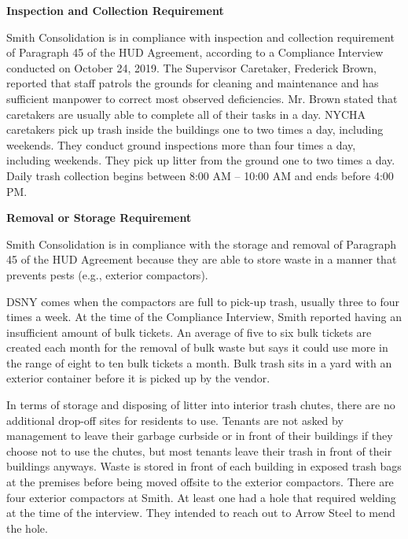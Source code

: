 

\textbf{Inspection and Collection Requirement} 

Smith Consolidation is in compliance with inspection and collection requirement of Paragraph 45 of the HUD Agreement, according to a Compliance Interview conducted on October 24, 2019. The Supervisor Caretaker, Frederick Brown, reported that staff patrols the grounds for cleaning and maintenance and has sufficient manpower to correct most observed deficiencies. Mr. Brown stated that caretakers are usually able to complete all of their tasks in a day.  NYCHA caretakers pick up trash inside the buildings one to two times a day, including weekends. They conduct ground inspections more than four times a day, including weekends. They pick up litter from the ground one to two times a day. Daily trash collection begins between 8:00 AM -- 10:00 AM and ends before 4:00 PM. 

 

\textbf{Removal or Storage Requirement} 

Smith Consolidation is in compliance with the storage and removal of Paragraph 45 of the HUD Agreement because they are able to store waste in a manner that prevents pests (e.g., exterior compactors). 

DSNY comes when the compactors are full to pick-up trash, usually three to four times a week. At the time of the Compliance Interview, Smith reported having an insufficient amount of bulk tickets. An average of five to six bulk tickets are created each month for the removal of bulk waste but says it could use more in the range of eight to ten bulk tickets a month. Bulk trash sits in a yard with an exterior container before it is picked up by the vendor.  

 

In terms of storage and disposing of litter into interior trash chutes, there are no additional drop-off sites for residents to use. Tenants are not asked by management to leave their garbage curbside or in  front of their buildings if they choose not to use the chutes, but most tenants leave their trash in front of their buildings anyways. Waste is stored in front of each building in exposed trash bags at the premises before being moved offsite to the exterior compactors. There are four exterior compactors at Smith. At least one had a hole that required welding at the time of the interview. They intended to reach out to Arrow Steel to mend the hole.

 

